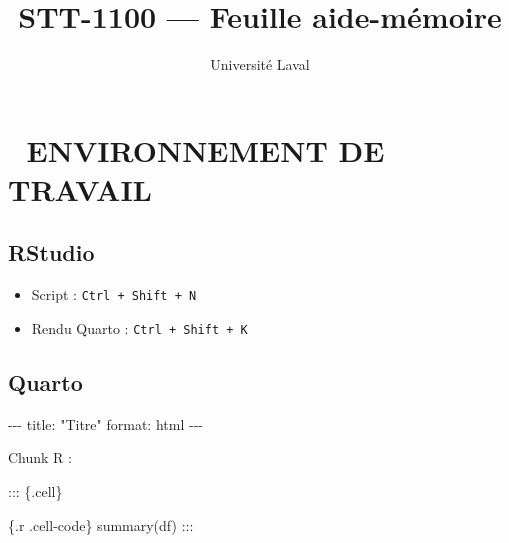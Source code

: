 \documentclass[
  8pt,
  letterpaper,
  DIV=11,
  numbers=noendperiod]{scrartcl}
\title{STT-1100 --- Feuille aide-mémoire}
\author{Université Laval}
\date{}
\newenvironment{Shaded}{\begin{snugshade}}{\end{snugshade}}
\newcommand{\AnnotationTok}[1]{\textcolor[rgb]{0.37,0.37,0.37}{#1}}
\newcommand{\AttributeTok}[1]{\textcolor[rgb]{0.40,0.45,0.13}{#1}}
\newcommand{\CommentTok}[1]{\textcolor[rgb]{0.37,0.37,0.37}{#1}}
\newcommand{\ConstantTok}[1]{\textcolor[rgb]{0.56,0.35,0.01}{#1}}
\newcommand{\FunctionTok}[1]{\textcolor[rgb]{0.28,0.35,0.67}{#1}}
\newcommand{\NormalTok}[1]{\textcolor[rgb]{0.00,0.23,0.31}{#1}}
\newcommand{\SpecialCharTok}[1]{\textcolor[rgb]{0.37,0.37,0.37}{#1}}
\newcommand{\StringTok}[1]{\textcolor[rgb]{0.13,0.47,0.30}{#1}}
\providecommand{\tightlist}{%
  \setlength{\itemsep}{0pt}\setlength{\parskip}{0pt}}
\begin{document}
\maketitle


\begin{Shaded}
\end{Shaded}

\section{🧰 ENVIRONNEMENT DE TRAVAIL}\label{environnement-de-travail}

\subsection{RStudio}\label{rstudio}

\begin{itemize}
\tightlist
\item
  Script : \texttt{Ctrl\ +\ Shift\ +\ N}
\item
  Rendu Quarto : \texttt{Ctrl\ +\ Shift\ +\ K}
\end{itemize}

\subsection{Quarto}\label{quarto}

\begin{Shaded}
\begin{Highlighting}[]
\CommentTok{{-}{-}{-}}
\AnnotationTok{title:}\CommentTok{ "Titre"}
\AnnotationTok{format:}\CommentTok{ html}
\CommentTok{{-}{-}{-}}
\end{Highlighting}
\end{Shaded}

Chunk R :

\begin{Shaded}
\begin{Highlighting}[]

\SpecialCharTok{:::}\NormalTok{ \{.cell\}}

\StringTok{\textasciigrave{}\textasciigrave{}\textasciigrave{}}\AttributeTok{\{.r .cell{-}code\}}
\AttributeTok{summary(df)}
\StringTok{\textasciigrave{}\textasciigrave{}\textasciigrave{}}
\SpecialCharTok{:::}
\end{Highlighting}
\end{Shaded}
\end{document}
